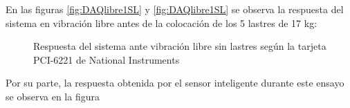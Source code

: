 En las figuras \ref{fig:DAQlibre1SL} y \ref{fig:DAQlibre1SL} se observa la respuesta del sistema en vibración libre antes de la colocación de los 5 lastres de 17 kg:

\begin{figure}[H]
    \centering
    \hfill
    \caption{Respuesta del sistema ante vibración libre sin lastres según la tarjeta PCI-6221 de National Instruments}
    \label{fig:DAQlibreSL}
\end{figure}

Por su parte, la respuesta obtenida por el sensor inteligente durante este ensayo se observa en la figura 

